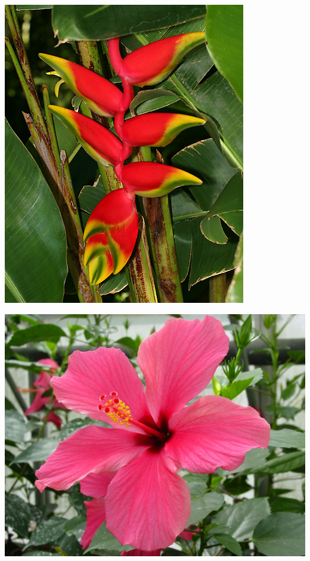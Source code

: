 \documentclass{article}
\begin{document}
\begin{center}
\includegraphics[width=0.9\textheight, angle=90]{../Heliconia_rostrata.jpg}
\end{center}
\newpage

\begin{center}
\includegraphics[width=0.9\textheight, angle=90]{../Hibiscus.jpg}
\end{center}
\newpage
\end{document}
